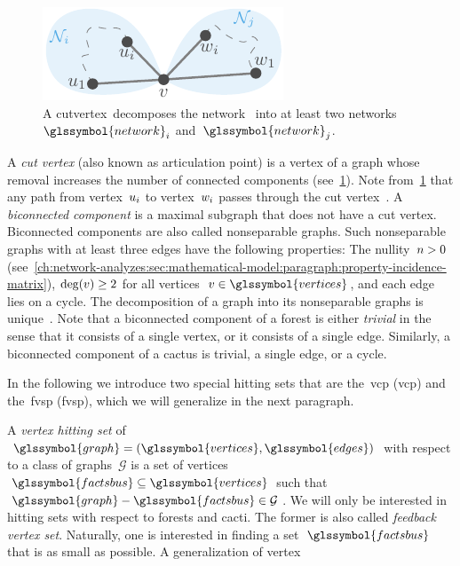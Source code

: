 \begin{figure}%
    \includegraphics[scale=1,page=1]{factsplacement/figures/cutvertex.pdf}%
    \caption[A cutvertex decomposes the network.]{%
    A cutvertex~\vertex decomposes the network~ into at least
    two networks~$\glssymbol{network}_i$ and~$\glssymbol{network}_j$.
    }%
    \label{ch:facts:fig:cutvertex}
\end{figure}%
%
A \emph{cut vertex} (also known as articulation point) is a vertex of a graph
whose removal increases the number of connected components
(see~\cref{ch:facts:fig:cutvertex}). Note from~\cref{ch:facts:fig:cutvertex}
that any path from vertex~$u_{i}$ to vertex~$w_{i}$ passes through
the cut vertex~\vertex. A \emph{biconnected component} is a maximal subgraph
that does not have a cut vertex. Biconnected components are also called
nonseparable graphs. Such nonseparable graphs with at least three edges have the
following properties: The nullity~$n > 0$
(see~\cref{ch:network-analyzes:sec:mathematical-model:paragraph:property-incidence-matrix}),
$\operatorname{deg}(v)\geq 2$ for all vertices~$\vertex\in\glssymbol{vertices}$, and
each edge lies on a cycle. The decomposition of a graph into its nonseparable
graphs is unique~\parencite[p.38]{Ses61}. Note that a biconnected component of a
forest is either \emph{trivial} in the sense that it consists of a single
vertex, or it consists of a single edge. Similarly, a biconnected component of a
cactus is trivial, a single edge, or a cycle. 

In the following we introduce two special hitting sets that are
the~\acrlong{vcp} (\gls{vcp}) and the~\acrlong{fvsp} (\gls{fvsp}), which we will
generalize in the next paragraph.
%
\begingroup
    
    \label{ch:facts:problem:vertex-cover}
\endgroup
%
\begingroup
    
    \label{ch:facts:problem:feedback-vertex-set}
\endgroup
% 

A \emph{vertex hitting set} of~$
\glssymbol{graph} 
= (
\glssymbol{vertices},
\glssymbol{edges})$ with respect to a class of graphs~$\mathcal G$ is a set of
vertices~$\glssymbol{factsbus}\subseteq\glssymbol{vertices}$ such
that~$\glssymbol{graph}-\glssymbol{factsbus} \in \mathcal G$. We will only be
interested in hitting sets with respect to forests and cacti. The former is also
called \emph{feedback vertex set}. Naturally, one is interested in finding a
set~$\glssymbol{factsbus}$ that is as small as possible. A generalization of
vertex

